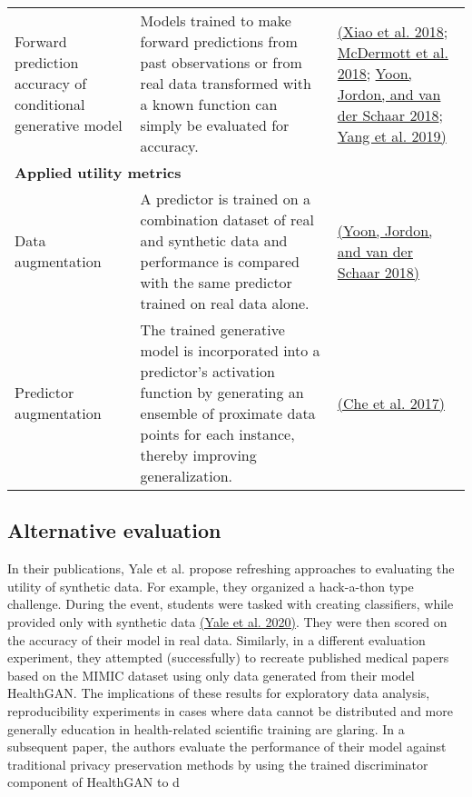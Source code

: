 \documentclass[10pt]{article}
\begin{document}
\begin{table}
\begin{tabular}{@{} p{} p{} p{} @{}}
        Forward prediction accuracy of conditional generative model &
        Models trained to make forward predictions from past observations or from real data transformed with a known function can simply be evaluated for accuracy. & \hyperref[csl:7]{(Xiao et al. 2018}; \hyperref[csl:8]{McDermott et al. 2018}; \hyperref[csl:51]{Yoon, Jordon, and van der Schaar 2018}; \hyperref[csl:54]{Yang et al. 2019)}\\
        

        \multicolumn{3}{Y}{\textbf{Applied utility metrics}}\\ \midrule

        
        Data augmentation & A predictor is trained on a combination dataset of real and synthetic data and performance is compared with the same predictor trained on real data alone. & \hyperref[csl:21]{(Yoon, Jordon, and van der Schaar 2018)}\\
        
        Predictor augmentation & The trained generative model is incorporated into a predictor's activation function by generating an ensemble of proximate data points for each instance, thereby improving generalization. & \hyperref[csl:15]{(Che et al. 2017)}\\
        
        \bottomrule
        
        \end{tabular}
\end{table}



\subsection{Alternative evaluation}
In their publications, Yale et al. propose refreshing approaches to evaluating the utility of synthetic data. For example, they organized a hack-a-thon type challenge. During the event, students were tasked with creating classifiers, while provided only with synthetic data \hyperref[csl:19]{(Yale et al. 2020)}. They were then scored on the accuracy of their model in real data. Similarly, in a different evaluation experiment, they attempted (successfully) to recreate published medical papers based on the MIMIC dataset using only data generated from their model HealthGAN. The implications of these results for exploratory data analysis, reproducibility experiments in cases where data cannot be distributed and more generally education in health-related scientific training are glaring. In a subsequent paper, the authors evaluate the performance of their model against traditional privacy preservation methods by using the trained discriminator component of HealthGAN to d
\end{document}
